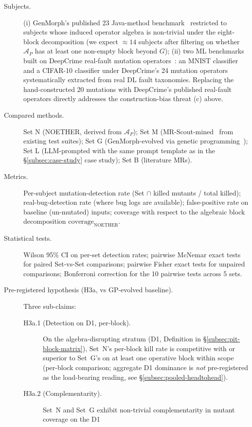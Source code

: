 \documentclass[acmsmall, screen]{acmart}
\begin{document}
\begin{description}
  \item[Subjects.] (i) GenMorph's published 23 Java-method benchmark~\cite{GenMorph2024} restricted to subjects whose induced operator algebra is non-trivial under the eight-block decomposition (we expect $\approx 14$ subjects after filtering on whether $\mathcal{A}_P$ has at least one non-empty block beyond $G$); (ii) two ML benchmarks built on DeepCrime real-fault mutation operators~\cite{Humbatova2021DeepCrime}: an MNIST classifier and a CIFAR-10 classifier under DeepCrime's 24 mutation operators systematically extracted from real DL fault taxonomies. Replacing the hand-constructed 20 mutations with DeepCrime's published real-fault operators directly addresses the construction-bias threat (c) above.
  \item[Compared methods.] Set N (NOETHER, derived from $\mathcal{A}_P$); Set M (MR-Scout-mined~\cite{MRScout2024} from existing test suites); Set G (GenMorph-evolved via genetic programming~\cite{GenMorph2024}); Set L (LLM-prompted with the same prompt template as in the §\ref{subsec:case-study} case study); Set B (literature MRs).
  \item[Metrics.] Per-subject mutation-detection rate (Set $\cap$ killed mutants / total killed); real-bug-detection rate (where bug logs are available); false-positive rate on baseline (un-mutated) inputs; coverage with respect to the algebraic block decomposition $\mathrm{coverage}_{\mathrm{NOETHER}}$.
  \item[Statistical tests.] Wilson 95\% CI on per-set detection rates; pairwise McNemar exact tests for paired Set-vs-Set comparisons; pairwise Fisher exact tests for unpaired comparisons; Bonferroni correction for the 10 pairwise tests across 5 sets.
  \item[Pre-registered hypothesis (H3a, vs GP-evolved baseline).]
  Three sub-claims:
  \begin{description}
    \item[H3a.1 (Detection on D1, per-block).] On the
      algebra-disrupting stratum (D1, Definition in
      \S\ref{subsec:pit-block-matrix}), Set~N's per-block kill rate
      is competitive with or superior to Set~G's on at least one
      operative block within scope (per-block comparison; aggregate
      D1 dominance is \emph{not} pre-registered as the load-bearing
      reading, see \S\ref{subsec:pooled-headtohead}).
    \item[H3a.2 (Complementarity).] Set~N and Set~G exhibit
      non-trivial complementarity in mutant coverage on the D1

\end{description}
\end{description}
\end{document}
